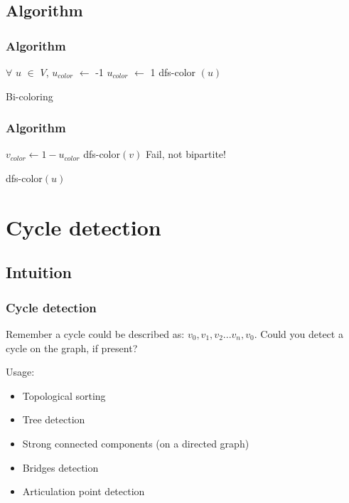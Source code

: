 \documentclass[article]{beamer}
\begin{document}

\subsection{Algorithm}
\begin{frame}
	\frametitle{Algorithm}
	\begin{algorithm}[H]
		\begin{algorithmic}[1]
		\STATE $\forall$ $u$ $\in$ $V$, $u_{color}$ $\gets$ -1				
		\STATE $u_{color}$ $\gets$ 1
		\STATE dfs-color $(u)$
		\ENDIF
		\ENDFOR		
		
		\end{algorithmic}
		\caption{Bi-coloring}
		\label{alg:seq}
		\end{algorithm}
\end{frame}

\begin{frame}
	\frametitle{Algorithm}
	\begin{algorithm}[H]
		\begin{algorithmic}[1]
		\STATE $v_{color} \gets 1 - u_{color}$
		\STATE dfs-color$(v)$
		\STATE Fail, not bipartite!
		\ENDIF
		\ENDFOR
		\end{algorithmic}
		\caption{dfs-color$(u)$}
		\label{alg:seq}
		\end{algorithm}
\end{frame}


\section{Cycle detection}
\subsection{Intuition}
\begin{frame}
	\frametitle{Cycle detection}
	Remember a cycle could be described as: \textbf{$v_{0}, v_{1}, v_{2} ... v_{n}, v_{0}$}. Could you detect a cycle on the graph, if present?
	
	\vspace{5mm}
	
	Usage:
	\begin{itemize}
		\item Topological sorting
		\item Tree detection
		\item Strong connected components (on a directed graph)
		\item Bridges detection 
		\item Articulation point detection
	\end{itemize}
\end{frame}
\end{document}
